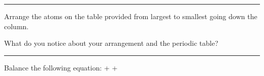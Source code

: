 \documentclass[12pt]{exam}
\begin{document}
\noindent\rule{\textwidth}{1pt}

Arrange the atoms on the table provided from largest to smallest going down the column.

\begin{questions}
  \question What do you notice about your arrangement and the periodic table?

  \vspace{4cm}

\end{questions}

\noindent\rule{\textwidth}{1pt}
\begin{questions}
 \question Balance the following equation: 
 \vspace{1cm}
  + \fillin[2][.5cm] \ce{->}   + \fillin[2][.5cm]


\end{questions}
\end{document}

